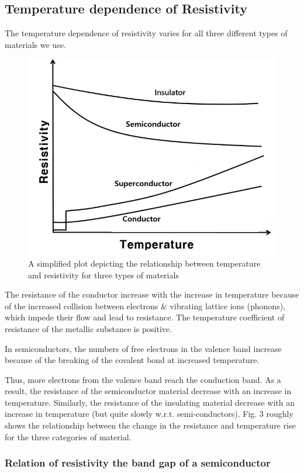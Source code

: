 \subsection{Temperature dependence of Resistivity}
The temperature dependence of resistivity varies for all three different types of materials we use.
\begin{figure}[H]
    \centering
    \includegraphics[width=.8\columnwidth]{images/t2.png}
    \caption{A simplified plot depicting the relationship between temperature and resistivity for three types of materials}
\end{figure}

The resistance of the conductor increase with the increase in temperature because of the increased collision between electrons \& vibrating lattice ions (phonons), which impede their flow and lead to resistance. The temperature coefficient of resistance of the metallic substance is positive.

In semiconductors, the numbers of free electrons in the valence band increase because of the breaking of the covalent bond at increased temperature. 

Thus, more electrons from the valence band reach the conduction band. As a result, the resistance of the semiconductor material decrease with an increase in temperature. 
Similarly, the resistance of the insulating material decrease with an increase in temperature (but quite slowly w.r.t. semi-conductors). Fig. 3 roughly shows the relationship between the change in the resistance and temperature rise for the three categories of material.

\subsubsection*{Relation of resistivity the band gap of a
semiconductor}

